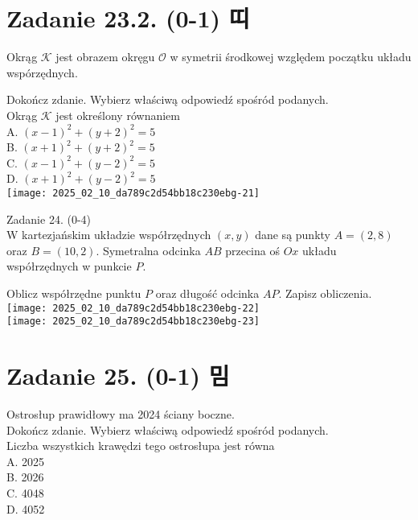 \documentclass[10pt]{article}
\begin{document}
\section*{Zadanie 23.2. (0-1) 띠}
Okrąg \(\mathcal{K}\) jest obrazem okręgu \(\mathcal{O}\) w symetrii środkowej względem początku układu wspórzędnych.

Dokończ zdanie. Wybierz właściwą odpowiedź spośród podanych.\\
Okrąg \(\mathcal{K}\) jest określony równaniem\\
A. \((x-1)^{2}+(y+2)^{2}=5\)\\
B. \((x+1)^{2}+(y+2)^{2}=5\)\\
C. \((x-1)^{2}+(y-2)^{2}=5\)\\
D. \((x+1)^{2}+(y-2)^{2}=5\)\\
\texttt{[image: 2025\_02\_10\_da789c2d54bb18c230ebg-21]}

Zadanie 24. (0-4)\\
W kartezjańskim układzie współrzędnych \((x, y)\) dane są punkty \(A=(2,8)\) oraz \(B=(10,2)\). Symetralna odcinka \(A B\) przecina oś \(O x\) układu współrzędnych w punkcie \(P\).

Oblicz współrzędne punktu \(P\) oraz długość odcinka \(A P\). Zapisz obliczenia.\\
\texttt{[image: 2025\_02\_10\_da789c2d54bb18c230ebg-22]}\\
\texttt{[image: 2025\_02\_10\_da789c2d54bb18c230ebg-23]}

\section*{Zadanie 25. (0-1) 밈}
Ostrosłup prawidłowy ma 2024 ściany boczne.\\
Dokończ zdanie. Wybierz właściwą odpowiedź spośród podanych.\\
Liczba wszystkich krawędzi tego ostrosłupa jest równa\\
A. 2025\\
B. 2026\\
C. 4048\\
D. 4052
\end{document}
